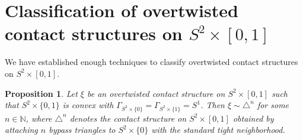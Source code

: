 \documentclass[12pt]{amsart}
\newtheorem{prop}[thm]{Proposition}
\theoremstyle{remark}
\begin{document}
\section{Classification of overtwisted contact structures on $S^2\times[0,1]$}

We have established enough techniques to classify overtwisted contact structures on $S^2\times[0,1]$.

\begin{prop} \label{Classifi}
Let $\xi$ be an overtwisted contact structure on $S^2\times[0,1]$ such that $S^2\times\{0,1\}$ is convex with $\Gamma_{S^2\times\{0\}}=\Gamma_{S^2\times\{1\}}=S^1$. Then $\xi\sim\triangle^n$ for some $n\in\mathbb{N}$, where $\triangle^{n}$ denotes the contact structure on $S^2\times[0,1]$ obtained by attaching $n$ bypass triangles to $S^2\times\{0\}$ with the standard tight neighborhood.
\end{prop}
\end{document}
